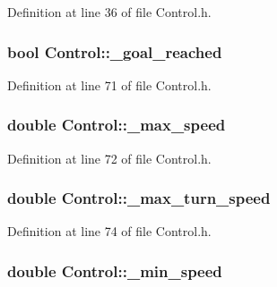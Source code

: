 Definition at line 36 of file Control.\-h.

\hypertarget{classControl_a3453d34c9b9f47445c0eabc0f774093c}{
\subsubsection[{\-\_\-goal\-\_\-reached}]{\setlength{\rightskip}{0pt plus 5cm}bool Control\-::\-\_\-goal\-\_\-reached\hspace{0.3cm}{\ttfamily [private]}}}\label{classControl_a3453d34c9b9f47445c0eabc0f774093c}


Definition at line 71 of file Control.\-h.

\hypertarget{classControl_ab80522a9174a2af4a37fe8a4ba6ca6d0}{
\subsubsection[{\-\_\-max\-\_\-speed}]{\setlength{\rightskip}{0pt plus 5cm}double Control\-::\-\_\-max\-\_\-speed\hspace{0.3cm}{\ttfamily [private]}}}\label{classControl_ab80522a9174a2af4a37fe8a4ba6ca6d0}


Definition at line 72 of file Control.\-h.

\hypertarget{classControl_a2864230e3525ef542b9f3c2c3e91f9aa}{
\subsubsection[{\-\_\-max\-\_\-turn\-\_\-speed}]{\setlength{\rightskip}{0pt plus 5cm}double Control\-::\-\_\-max\-\_\-turn\-\_\-speed\hspace{0.3cm}{\ttfamily [private]}}}\label{classControl_a2864230e3525ef542b9f3c2c3e91f9aa}


Definition at line 74 of file Control.\-h.

\hypertarget{classControl_adc6737dda1cb8b841b486e77d5b3b93c}{
\subsubsection[{\-\_\-min\-\_\-speed}]{\setlength{\rightskip}{0pt plus 5cm}double Control\-::\-\_\-min\-\_\-speed\hspace{0.3cm}{\ttfamily [private]}}}\label{classControl_adc6737dda1cb8b841b486e77d5b3b93c}


